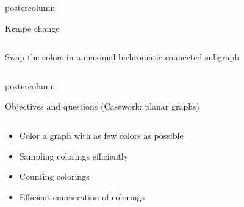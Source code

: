 \begin{frame}
\begin{columns}
\begin{column}{.49\textwidth}
\begin{beamercolorbox}[center,wd=\textwidth]{postercolumn}
\begin{minipage}[T]{.95\textwidth}
\begin{block}{Kempe change}
\begin{columns}
\begin{column}{.49\textwidth}
              \end{column}
            \end{columns}
            \vspace{1cm}
            Swap the colors in a maximal bichromatic connected subgraph
            
          \end{block}

        \end{minipage}
      \end{beamercolorbox}
    \end{column}
  \end{columns}

  \begin{beamercolorbox}[center,wd=\textwidth]{postercolumn}
    \begin{minipage}[T]{.97\textwidth}
      \begin{block}{Objectives and questions (Casework: planar graphs)}            
        \centering
        \begin{columns}
          \begin{column}{.49\textwidth}
            \begin{itemize}
            \item Color a graph  with as few colors as possible
            \item Sampling colorings efficiently
            \item Counting colorings
            \item Efficient enumeration of colorings 
            \end{itemize}
            

\end{column}
\end{columns}
\end{block}
\end{minipage}
\end{beamercolorbox}
\end{frame}

